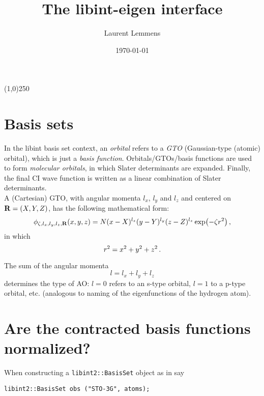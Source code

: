 \documentclass[12pt]{article}
\title{The libint-eigen interface}
\author{Laurent Lemmens}
\date{\today \hspace{6pt} \currenttime}
\begin{document}
\maketitle

\begin{center}
\line(1,0){250}
\end{center}

\tableofcontents
\newpage



\section{Basis sets}
    In the libint basis set context, an \textit{orbital} refers to a \textit{GTO} (Gaussian-type (atomic) orbital), which is just a \textit{basis function}. Orbitals/GTOs/basis functions are used to form \textit{molecular orbitals}, in which Slater determinants are expanded. Finally, the final CI wave function is written as a linear combination of Slater determinants. \\

    A (Cartesian) GTO, with angular momenta $l_x$, $l_y$ and $l_z$ and centered on $\vb{R}=(X, Y, Z)$, has the following mathematical form:
    \begin{equation}
        \phi_{\zeta, l_x, l_y, l_z, \vb{R}}(x, y, z) = N (x - X)^{l_z} (y - Y)^{l_y} (z - Z)^{l_z} \exp(-\zeta r^2) \thinspace ,
    \end{equation}
    in which
    \begin{equation}
        r^2 = x^2 + y^2 + z^2 \thinspace .
    \end{equation}

    The sum of the angular momenta
    \begin{equation}
        l = l_x + l_y + l_z
    \end{equation}
    determines the type of AO: $l=0$ refers to an s-type orbital, $l=1$ to a p-type orbital, etc. (analogous to naming of the eigenfunctions of the hydrogen atom).



\section{Are the contracted basis functions normalized?}

    When constructing a \lstinline{libint2::BasisSet} object as in say

\begin{lstlisting}
libint2::BasisSet obs ("STO-3G", atoms);
\end{lstlisting}
\end{document}
